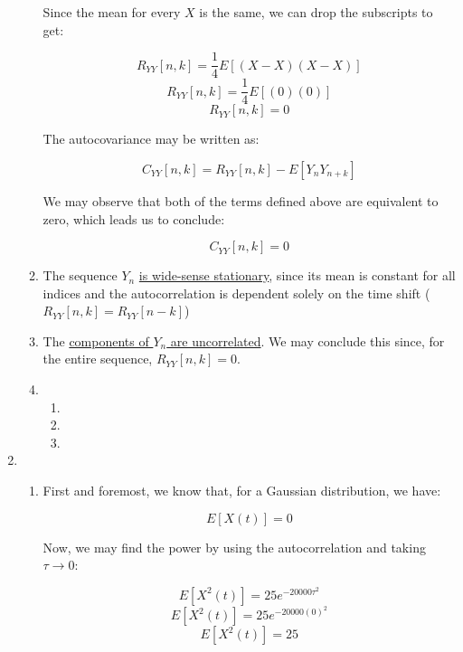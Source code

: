 \begin{enumerate}
\begin{enumerate}
        Since the mean for every $X$ is the same, we can drop the subscripts to get:

        $$R_{YY}[n,k]=\frac{1}{4}E[(X-X)(X-X)]$$
        $$R_{YY}[n,k]=\frac{1}{4}E[(0)(0)]$$
        $$\boxed{R_{YY}[n,k]=0}$$

        The autocovariance may be written as:

        $$C_{YY}[n,k]=R_{YY}[n,k]-E[Y_nY_{n+k}]$$

        We may observe that both of the terms defined above are equivalent to zero, which leads us to conclude:

        $$\boxed{C_{YY}[n,k]=0}$$

      \item The sequence $Y_n$ \underline{is wide-sense stationary}, since its mean is constant for all indices and the autocorrelation is dependent solely on the time shift ($R_{YY}[n,k]=R_{YY}[n-k]$)

      \item The \underline{components of $Y_n$ are uncorrelated}. We may conclude this since, for the entire sequence, $R_{YY}[n,k]=0$.

      \item 

        \begin{enumerate}

          \item 

          \item 

          \item 

        \end{enumerate}

    \end{enumerate}

  \item

    \begin{enumerate}

      \item First and foremost, we know that, for a Gaussian distribution, we have:

        $$\boxed{E[X(t)]=0}$$

        Now, we may find the power by using the autocorrelation and taking $\tau\to0$:

        $$E[X^2(t)]=25e^{-20000\tau^2}$$
        $$E[X^2(t)]=25e^{-20000(0)^2}$$
        $$\boxed{E[X^2(t)]=25}$$


\end{enumerate}
\end{enumerate}
